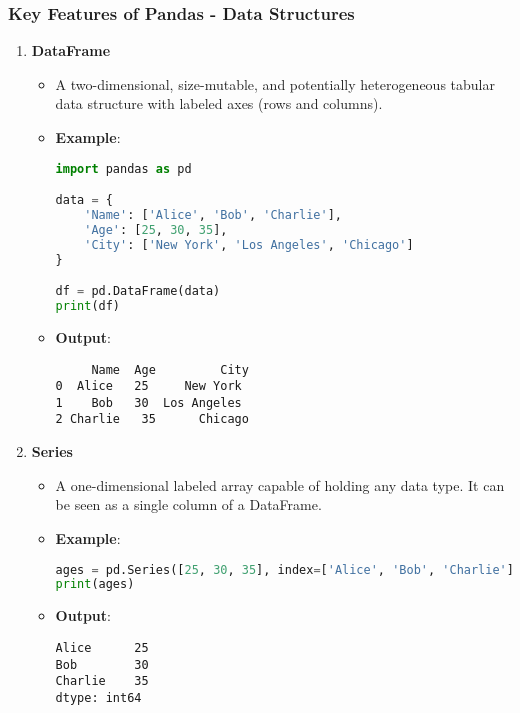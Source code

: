 \documentclass[aspectratio=169]{beamer}
\begin{document}
\begin{frame}[fragile]
    \frametitle{Key Features of Pandas - Data Structures}
    \begin{enumerate}
        \item \textbf{DataFrame}
        \begin{itemize}
            \item A two-dimensional, size-mutable, and potentially heterogeneous tabular data structure with labeled axes (rows and columns).
            \item \textbf{Example}:
            \begin{lstlisting}[language=Python]
import pandas as pd

data = {
    'Name': ['Alice', 'Bob', 'Charlie'],
    'Age': [25, 30, 35],
    'City': ['New York', 'Los Angeles', 'Chicago']
}

df = pd.DataFrame(data)
print(df)
            \end{lstlisting}
            \item \textbf{Output}:
            \begin{lstlisting}
     Name  Age         City
0  Alice   25     New York
1    Bob   30  Los Angeles
2 Charlie   35      Chicago
            \end{lstlisting}
        \end{itemize}
        
        \item \textbf{Series}
        \begin{itemize}
            \item A one-dimensional labeled array capable of holding any data type. It can be seen as a single column of a DataFrame.
            \item \textbf{Example}:
            \begin{lstlisting}[language=Python]
ages = pd.Series([25, 30, 35], index=['Alice', 'Bob', 'Charlie'])
print(ages)
            \end{lstlisting}
            \item \textbf{Output}:
            \begin{lstlisting}
Alice      25
Bob        30
Charlie    35
dtype: int64
            \end{lstlisting}
        \end{itemize}
    \end{enumerate}
\end{frame}
\end{document}
